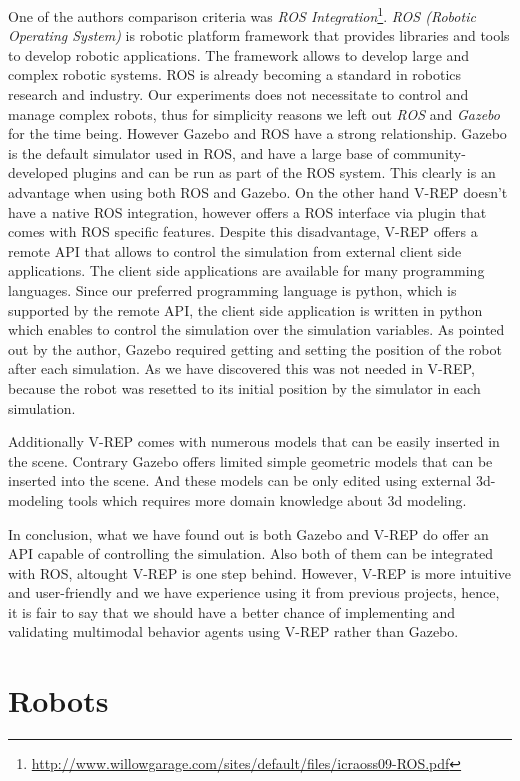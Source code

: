 \documentclass[format=acmsmall, review=false, screen=true]{acmart}
\begin{document}
One of the authors comparison criteria was \emph{ROS Integration}\footnote{\url{http://www.willowgarage.com/sites/default/files/icraoss09-ROS.pdf}}. \emph{ROS (Robotic Operating System)} is robotic platform framework that provides libraries and tools to develop robotic applications. The framework allows to develop large and complex robotic systems. ROS is already becoming a standard in robotics research and industry. Our experiments does not necessitate to control and manage complex robots, thus for simplicity reasons we left out \emph{ROS} and \emph{Gazebo} for the time being. However Gazebo and ROS have a strong relationship. Gazebo is the default simulator used in ROS, and have a large base of community-developed plugins and can be run as part of the ROS system. This clearly is an advantage when using both ROS and Gazebo. On the other hand V-REP doesn't have a native ROS integration, however offers a  ROS interface via plugin that comes with ROS specific features. Despite this disadvantage, V-REP offers a remote API that allows to control the simulation from external client side applications. The client side applications are available for many programming languages. Since our preferred programming language is python, which is supported by the remote API, the client side application is written in python which enables to control the simulation over the simulation variables. As pointed out by the author, Gazebo required getting and setting the position of the robot after each simulation. As we have discovered this was not needed in V-REP, because the robot was resetted to its initial position by the simulator in each simulation.

Additionally V-REP comes with numerous models that can be easily inserted in the scene. Contrary Gazebo offers limited simple geometric models that can be inserted into the scene. And these models can be only edited using external 3d-modeling tools which requires more domain knowledge about 3d modeling.

In conclusion, what we have found out is both Gazebo and V-REP do offer an API capable of controlling the simulation. Also both of them can be integrated with ROS, altought V-REP is one step behind. However, V-REP is more intuitive and user-friendly and we have experience using it from previous projects, hence, it is fair to say that we should have a better chance of implementing and validating multimodal behavior agents using V-REP rather than Gazebo.

\section{Robots}
\end{document}
